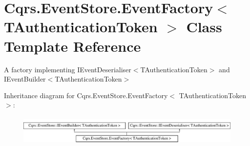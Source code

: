 \hypertarget{classCqrs_1_1EventStore_1_1EventFactory}{}\section{Cqrs.\+Event\+Store.\+Event\+Factory$<$ T\+Authentication\+Token $>$ Class Template Reference}
\label{classCqrs_1_1EventStore_1_1EventFactory}


A factory implementing I\+Event\+Deserialiser$<$\+T\+Authentication\+Token$>$ and I\+Event\+Builder$<$\+T\+Authentication\+Token$>$  


Inheritance diagram for Cqrs.\+Event\+Store.\+Event\+Factory$<$ T\+Authentication\+Token $>$\+:\begin{figure}[H]
\begin{center}
\leavevmode
\includegraphics[height=1.521739cm]{classCqrs_1_1EventStore_1_1EventFactory}
\end{center}
\end{figure}
